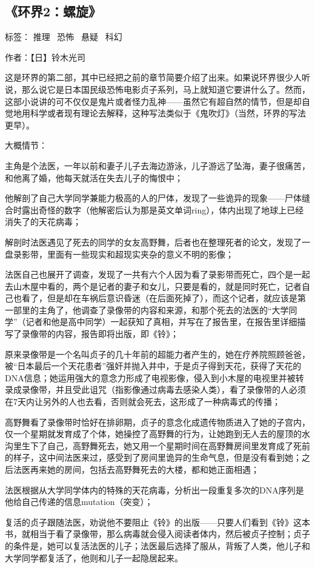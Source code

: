\subsection{《环界2：螺旋》}

标签： 推理 \ 恐怖 \ 悬疑 \ 科幻

作者：【日】铃木光司

这是环界的第二部，其中已经把之前的章节简要介绍了出来。如果说环界很少人听说，那么说它是日本国民级恐怖电影贞子系列，马上就知道它要讲什么了。然而，这部小说讲的可不仅仅是鬼片或者怪力乱神——虽然它有超自然的情节，但是却自觉地用科学或者现有理论去解释，这种写法类似于《鬼吹灯》（当然，环界的写法更早）。

大概情节：
\begin{itemize*}
    \item 主角是个法医，一年以前和妻子儿子去海边游泳，儿子游远了坠海，妻子很痛苦，和他离了婚，他每天就活在失去儿子的悔恨中；
    \item 他解剖了自己大学同学兼能力极高的人的尸体，发现了一些诡异的现象——尸体缝合时露出奇怪的数字（他解密后认为那是英文单词ring），体内出现了地球上已经消失了的天花病毒；
    \item 解剖时法医遇见了死去的同学的女友高野舞，后者也在整理死者的论文，发现了一盘录影带，里面有一些现实和超现实夹杂的意义不明的影像；
    \item 法医自己也展开了调查，发现了一共有六个人因为看了录影带而死亡，四个是一起去山木屋中看的，两个是记者的妻子和女儿，只要是看的，就是同时死亡，记者自己也看了，但是却在车祸后意识昏迷（在后面死掉了），而这个记者，就应该是第一部里的主角了，他调查了录像带的内容和来源，和那个死去的法医的“大学同学”（记者和他是高中同学）一起获知了真相，并写在了报告里，在报告里详细描写了录像带的内容，报告即将出版，即《铃》；
    \item 原来录像带是一个名叫贞子的几十年前的超能力者产生的，她在疗养院照顾爸爸，被“日本最后一个天花患者”强奸并抛入井中，于是贞子得到天花，获得了天花的DNA信息；她运用强大的意念力形成了电视影像，侵入到小木屋的电视里并被转录成录像带，并且受此诅咒（指影像通过病毒去感染人类），看了录像带的人必须在7天内让另外的人也去看，否则就会死去，这形成了一种病毒式的传播；
    \item 高野舞看了录像带时恰好在排卵期，贞子的意念化成遗传物质进入了她的子宫内，仅一个星期就发育成了个体，她操控了高野舞的行为，让她跑到无人去的屋顶的水沟里生下了自己，高野舞死去，她又用一个星期时间在高野舞房间里发育成了死前的样子，这中间法医来过，感受到了房间里诡异的生命气息，但是没有看到她；之后法医再来她的房间，包括去高野舞死去的大楼，都和她正面相遇；
    \item 法医根据从大学同学体内的特殊的天花病毒，分析出一段重复多次的DNA序列是他给自己传递的信息mutation（突变）；
    \item 复活的贞子跟随法医，劝说他不要阻止《铃》的出版——只要人们看到《铃》这本书，就相当于看了录像带，那么病毒就会侵入阅读者体内，然后被贞子控制；贞子的条件是，她可以复活法医的儿子；法医最后选择了服从，背叛了人类，他儿子和大学同学都复活了，他则和儿子一起隐居起来。
\end{itemize*}

